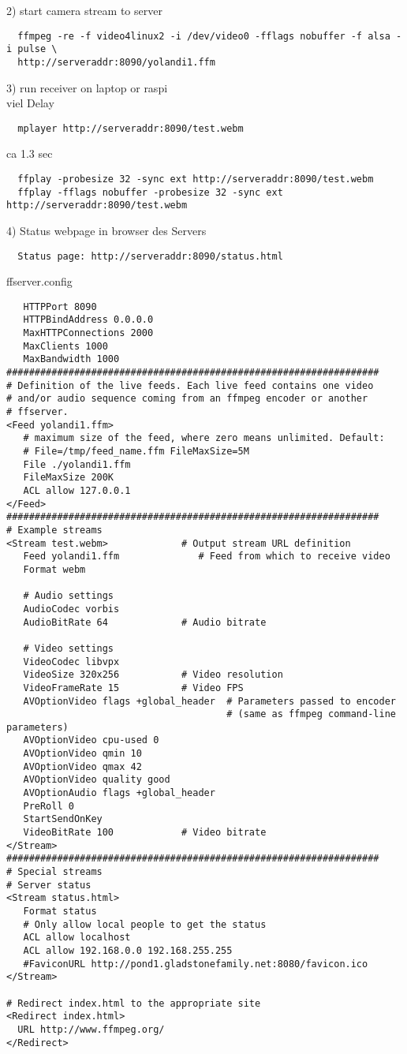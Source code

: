 2) start camera stream to server
\begin{verbatim}
  ffmpeg -re -f video4linux2 -i /dev/video0 -fflags nobuffer -f alsa -i pulse \
  http://serveraddr:8090/yolandi1.ffm
\end{verbatim}

3) run receiver on laptop or raspi\\
viel Delay
\begin{verbatim}
  mplayer http://serveraddr:8090/test.webm
\end{verbatim}

ca 1.3 sec
\begin{verbatim}
  ffplay -probesize 32 -sync ext http://serveraddr:8090/test.webm
  ffplay -fflags nobuffer -probesize 32 -sync ext http://serveraddr:8090/test.webm
\end{verbatim}

4) Status webpage in browser des Servers
\begin{verbatim}
  Status page: http://serveraddr:8090/status.html
\end{verbatim}

ffserver.config
\begin{verbatim}
   HTTPPort 8090
   HTTPBindAddress 0.0.0.0
   MaxHTTPConnections 2000
   MaxClients 1000
   MaxBandwidth 1000
##################################################################
# Definition of the live feeds. Each live feed contains one video
# and/or audio sequence coming from an ffmpeg encoder or another
# ffserver.
<Feed yolandi1.ffm>
   # maximum size of the feed, where zero means unlimited. Default:
   # File=/tmp/feed_name.ffm FileMaxSize=5M
   File ./yolandi1.ffm
   FileMaxSize 200K
   ACL allow 127.0.0.1
</Feed>
##################################################################
# Example streams
<Stream test.webm>             # Output stream URL definition
   Feed yolandi1.ffm              # Feed from which to receive video
   Format webm

   # Audio settings
   AudioCodec vorbis
   AudioBitRate 64             # Audio bitrate

   # Video settings
   VideoCodec libvpx
   VideoSize 320x256           # Video resolution
   VideoFrameRate 15           # Video FPS
   AVOptionVideo flags +global_header  # Parameters passed to encoder
                                       # (same as ffmpeg command-line parameters)
   AVOptionVideo cpu-used 0
   AVOptionVideo qmin 10
   AVOptionVideo qmax 42
   AVOptionVideo quality good
   AVOptionAudio flags +global_header
   PreRoll 0
   StartSendOnKey
   VideoBitRate 100            # Video bitrate
</Stream>
##################################################################
# Special streams
# Server status
<Stream status.html>
   Format status  
   # Only allow local people to get the status
   ACL allow localhost
   ACL allow 192.168.0.0 192.168.255.255
   #FaviconURL http://pond1.gladstonefamily.net:8080/favicon.ico
</Stream>

# Redirect index.html to the appropriate site
<Redirect index.html>
  URL http://www.ffmpeg.org/
</Redirect>                
\end{verbatim}
